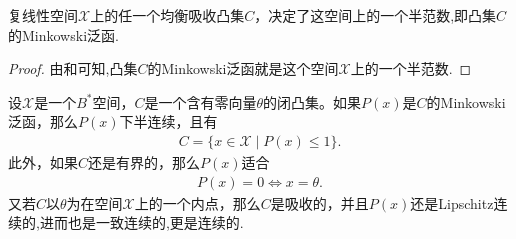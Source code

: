 \documentclass[../../main.tex]{subfiles}%
\begin{document}
\begin{proposition}\label{proposition:泛函分析--命题1.5.10}
复线性空间$\mathscr{X}$上的任一个均衡吸收凸集$C$，决定了这空间上的一个半范数,即凸集$C$的Minkowski泛函.
\end{proposition}
\begin{proof}

由和可知,凸集$C$的Minkowski泛函就是这个空间$\mathscr{X}$上的一个半范数.

\end{proof}

\begin{proposition}\label{proposition:泛函分析--命题1.5.11}
设$\mathscr{X}$是一个$B^*$空间，$C$是一个含有零向量$\theta$的闭凸集。如果$P(x)$是$C$的Minkowski泛函，那么$P(x)$下半连续，且有
\begin{align}
C = \{ x \in \mathscr{X} \mid P(x) \leqslant 1 \}. \label{eq:HJJIOu3fs1.5.3}
\end{align}
此外，如果$C$还是有界的，那么$P(x)$适合
\begin{align*}
P(x) = 0 \iff x = \theta.
\end{align*}
又若$C$以$\theta$为在空间$\mathscr{X}$上的一个内点，那么$C$是吸收的，并且$P(x)$还是Lipschitz连续的,进而也是一致连续的,更是连续的.
\end{proposition}
\end{document}
